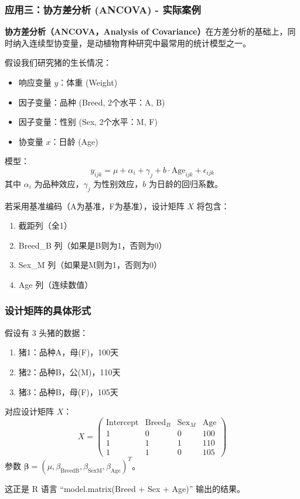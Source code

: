 
\begin{frame}
\frametitle{应用三：协方差分析 (ANCOVA) - 实际案例}

\textbf{协方差分析（ANCOVA，Analysis of Covariance）}在方差分析的基础上，同时纳入连续型协变量，是动植物育种研究中最常用的统计模型之一。

\vspace{0.5em}
假设我们研究猪的生长情况：
\begin{itemize}
    \item 响应变量 $y$：体重 (Weight)
    \item 因子变量：品种 (Breed, 2个水平：A, B)
    \item 因子变量：性别 (Sex, 2个水平：M, F)
    \item 协变量 $x$：日龄 (Age)
\end{itemize}

模型：
\[
y_{ijk} = \mu + \alpha_i + \gamma_j + b \cdot \text{Age}_{ijk} + \epsilon_{ijk}
\]
其中 $\alpha_i$ 为品种效应，$\gamma_j$ 为性别效应，$b$ 为日龄的回归系数。

若采用基准编码（A为基准，F为基准），设计矩阵 $X$ 将包含：
\begin{enumerate}
    \item 截距列（全1）
    \item Breed\_B 列（如果是B则为1，否则为0）
    \item Sex\_M 列（如果是M则为1，否则为0）
    \item Age 列（连续数值）
\end{enumerate}

\end{frame}


\begin{frame}
\frametitle{设计矩阵的具体形式}

假设有 3 头猪的数据：
\begin{enumerate}
    \item 猪1：品种A，母(F)，100天
    \item 猪2：品种B，公(M)，110天
    \item 猪3：品种B，母(F)，105天
\end{enumerate}

对应设计矩阵 $X$：
\[
X = \begin{pmatrix}
\text{Intercept} & \text{Breed}_B & \text{Sex}_M & \text{Age} \\
1 & 0 & 0 & 100 \\
1 & 1 & 1 & 110 \\
1 & 1 & 0 & 105
\end{pmatrix}
\]
参数 $\boldsymbol{\beta} = (\mu, \beta_{\text{BreedB}}, \beta_{\text{SexM}}, \beta_{\text{Age}})^T$。

这正是 R 语言 ``model.matrix(Breed + Sex + Age)'' 输出的结果。

\end{frame}

